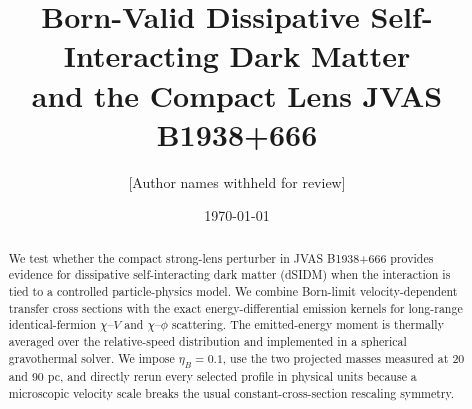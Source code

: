 \documentclass[12pt]{article}
\title{Born-Valid Dissipative Self-Interacting Dark Matter\\
and the Compact Lens JVAS B1938+666}
\author{[Author names withheld for review]}
\date{\today}
\begin{document}
\maketitle

\begin{abstract}
We test whether the compact strong-lens perturber in JVAS B1938+666
provides evidence for dissipative self-interacting dark matter (dSIDM) when
the interaction is tied to a controlled particle-physics model.  We combine
Born-limit velocity-dependent transfer cross sections with the exact
energy-differential emission kernels for long-range identical-fermion
$\chi$--$V$ and $\chi$--$\phi$ scattering.  The emitted-energy moment is
thermally averaged over the relative-speed distribution and implemented in a
spherical gravothermal solver.  We impose $\eta_B=0.1$, use the two projected
masses measured at 20 and 90 pc, and directly rerun every selected profile in
physical units because a microscopic velocity scale breaks the usual
constant-cross-section rescaling symmetry.


\end{abstract}
\end{document}

